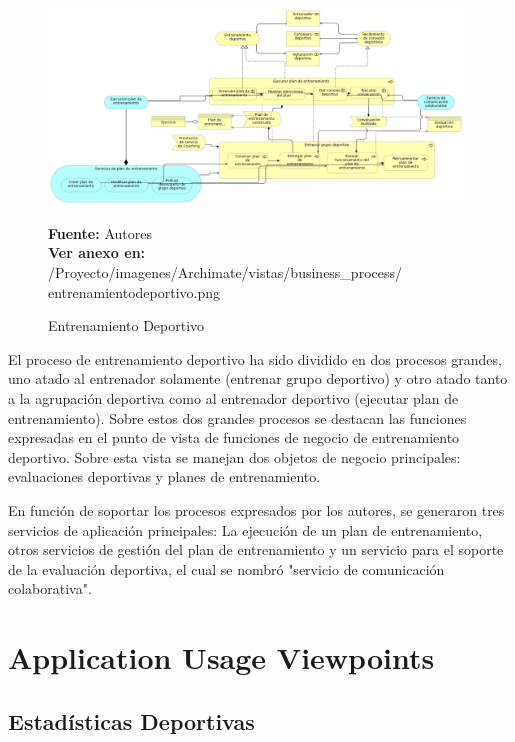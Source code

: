 \begin{figure}[!htb]
  \begin{center}
    \includegraphics[width=11cm]{./imagenes/Archimate/vistas/business_process/entrenamientodeportivo.png}
    \caption{Entrenamiento Deportivo}
    \label{fig:bp_entrenamiento_deportivo}
    \textbf{Fuente:}  Autores \\
     \textbf{Ver anexo en:} /Proyecto/imagenes/Archimate/vistas/business\_process/
     entrenamientodeportivo.png
  \end{center}
\end{figure}

El proceso de entrenamiento deportivo ha sido dividido en dos procesos grandes, uno atado al entrenador solamente (entrenar grupo deportivo) y otro atado tanto a la agrupación deportiva como al entrenador deportivo (ejecutar plan de entrenamiento). Sobre estos dos grandes procesos se destacan las funciones expresadas en el punto de vista de funciones de negocio de entrenamiento deportivo. Sobre esta vista se manejan dos objetos de negocio principales: evaluaciones deportivas y planes de entrenamiento.

En función de soportar los procesos expresados por los autores, se generaron tres servicios de aplicación principales: La ejecución de un plan de entrenamiento, otros servicios de gestión del plan de entrenamiento y un servicio para el soporte de la evaluación deportiva, el cual se nombró "servicio de comunicación colaborativa".

\section{Application Usage Viewpoints}

\subsection{Estadísticas Deportivas}

